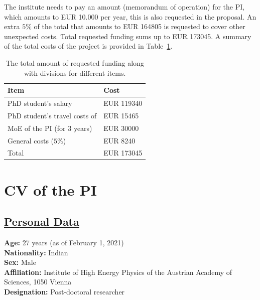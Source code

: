 \documentclass[a4paper,11pt]{article}
\begin{document}
The institute needs to pay an amount (memorandum of operation) for the PI, which amounts to EUR 10.000 per year, 
this is also requested in the proposal.
An extra $5\%$ of the total that amounts to EUR 164805 is requested to cover other unexpected costs.  
Total requested funding sums up to EUR 173045.  
A summary of the total costs of the project is provided in Table~\ref{Tab:Total_cost}.
\begin{table}
\caption{The total amount of requested funding along with divisions for different items.}
\begin{center}
{\renewcommand{\arraystretch}{1.3}
\begin{tabular}{m{6 cm}| m{4 cm}}
Item & Cost  \\
\hline 
PhD student's salary & EUR 119340  \\
PhD student's travel costs of & EUR 15465 \\
MoE of the PI (for 3 years) & EUR 30000 \\
\hline
General costs ($5\%$) & EUR 8240  \\
\hline
Total & EUR 173045 
\end{tabular}
}
\end{center}
\label{Tab:Total_cost}
\end{table}

\newpage


\section{CV of the PI}

\subsection*{\underline{Personal Data}}

\textbf{Age:} 27 years (as of February 1, 2021)\\
\textbf{Nationality:} Indian \\
\textbf{Sex:} Male \\
\textbf{Affiliation:} Institute of High Energy Physics of the Austrian Academy of Sciences, 1050 Vienna \\
\textbf{Designation:} Post-doctoral researcher 

\end{document}
